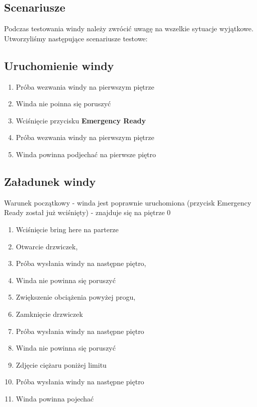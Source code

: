 \documentclass[a4paper,11pt]{article}
\begin{document}
\subsection{Scenariusze}
Podczas testowania windy należy zwrócić uwagę na wszelkie sytuacje wyjątkowe.
Utworzyliśmy następujące scenariusze testowe:
\subsection{Uruchomienie windy}
\begin{enumerate}
\item Próba wezwania windy na pierwszym piętrze
\item Winda nie poinna się poruszyć
\item Wciśnięcie przycisku \textbf{Emergency Ready}
\item Próba wezwania windy na pierwszym piętrze 
\item Winda powinna podjechać na pierwsze piętro
\end{enumerate}
\subsection{Załadunek windy}
Warunek początkowy - winda jest poprawnie uruchomiona (przycisk Emergency Ready został już wciśnięty) - znajduje się na piętrze 0
\begin{enumerate}
\item Wciśnięcie bring here na parterze
\item Otwarcie drzwiczek,
\item Próba wysłania windy na następne piętro,
\item Winda nie powinna się poruszyć
\item Zwiększenie obciążenia powyżej progu,
\item Zamknięcie drzwiczek
\item Próba wysłania windy na następne piętro 
\item Winda nie powinna się poruszyć
\item Zdjęcie ciężaru poniżej limitu
\item Próba wysłania windy na następne piętro
\item Winda powinna pojechać 
\end{enumerate}
\end{document}
